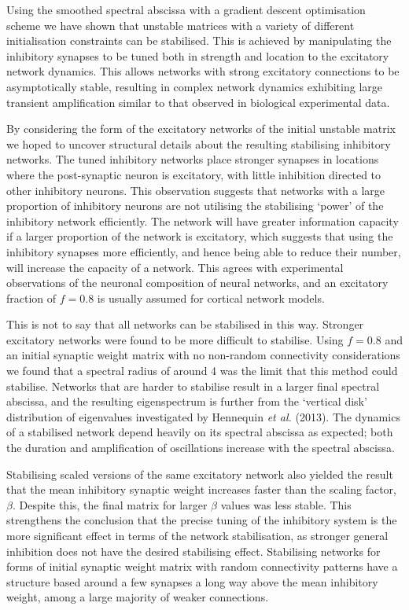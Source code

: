 \documentclass[12pt, a4paper]{article}
\begin{document}
Using the smoothed spectral abscissa with a gradient descent optimisation scheme we have shown that unstable matrices with a variety of different initialisation constraints can be stabilised. This is achieved by manipulating the inhibitory synapses to be tuned both in strength and location to the excitatory network dynamics.  This allows networks with strong excitatory connections to be asymptotically stable, resulting in complex network dynamics exhibiting large transient amplification similar to that observed in biological experimental data. 

By considering the form of the excitatory networks of the initial unstable matrix we hoped to uncover structural details about the resulting stabilising inhibitory networks.  The tuned inhibitory networks place stronger synapses in locations where the post-synaptic neuron is excitatory, with little inhibition directed to other inhibitory neurons.  This observation suggests that networks with a large proportion of inhibitory neurons are not utilising the stabilising `power' of the inhibitory network efficiently.  The network will have greater information capacity if a larger proportion of the network is excitatory, which suggests that using the inhibitory synapses more efficiently, and hence being able to reduce their number, will increase the capacity of a network.  This agrees with experimental observations of the neuronal composition of neural networks, and an excitatory fraction of $f=0.8$ is usually assumed for cortical network models.  

This is not to say that all networks can be stabilised in this way.  Stronger excitatory networks were found to be more difficult to stabilise.  Using $f = 0.8$ and an initial synaptic weight matrix with no non-random connectivity considerations we found that a spectral radius of around 4 was the limit that this method could stabilise.  Networks that are harder to stabilise result in a larger final spectral abscissa, and the resulting eigenspectrum is further from the `vertical disk' distribution of eigenvalues investigated by Hennequin \emph{et al.} (2013).  The dynamics of a stabilised network depend heavily on its spectral abscissa as expected; both the duration and amplification of oscillations increase with the spectral abscissa.  

Stabilising scaled versions of the same excitatory network also yielded the result that the mean inhibitory synaptic weight increases faster than the scaling factor, $\beta$.  Despite this, the final matrix for larger $\beta$ values was less stable.  This strengthens the conclusion that the precise tuning of the inhibitory system is the more significant effect in terms of the network stabilisation, as stronger general inhibition does not have the desired stabilising effect.  Stabilising networks for forms of initial synaptic weight matrix with random connectivity patterns have a structure based around a few synapses a long way above the mean inhibitory weight, among a large majority of weaker connections.  
\end{document}
